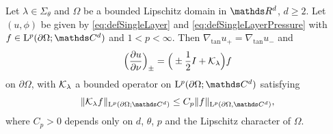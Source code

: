 \begin{thm}
  \label{thm:jumpConditions}
  Let $\lambda \in \Sigma_\theta$ and $\Omega$ be a bounded Lipschitz domain in $\R^d$, $d \geq 2$. 
  Let $(u,\phi)$ be given by \eqref{eq:defSingleLayer} and \eqref{eq:defSingleLayerPressure} with $f \in \Ell^p(\partial\Omega; \C^d)$ and $1 < p < \infty$.
  Then $\nabla_{\mathrm{tan}} u_+ = \nabla_{\mathrm{tan}} u_-$ and
  \begin{align}
    \label{eq:nontangentialConormalDerivative}
    \Big( \frac{\partial u}{\partial \nu} \Big)_\pm = \Big( \pm \frac{1}{2} I + \mathcal{K}_\lambda \Big) f
  \end{align}
  on $\partial\Omega$, with $\mathcal{K}_\lambda$ a bounded operator on $\Ell^p(\partial\Omega; \C^d)$ satisfying
  \begin{align*}
    \| \K_\lambda f \|_{\Ell^p(\partial\Omega; \C^d)} \leq C_p \|f\|_{\Ell^p(\partial\Omega, \C^d)},
  \end{align*}
  where $C_p > 0$ depends only on $d$, $\theta$, $p$ and the Lipschitz character of $\Omega$.
\end{thm}

